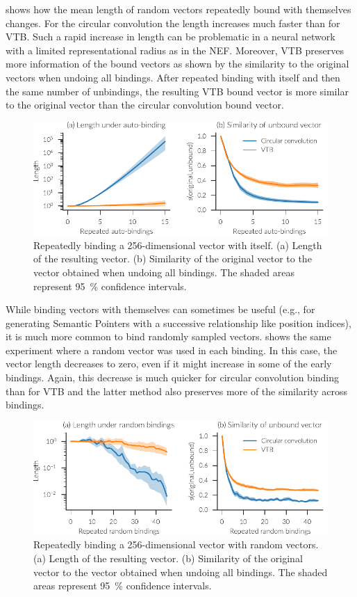 shows how the mean length of random vectors repeatedly bound with themselves changes.
For the circular convolution the length increases much faster than for VTB\@.
Such a rapid increase in length can be problematic in a neural network with a limited representational radius as in the NEF\@.
Moreover, VTB preserves more information of the bound vectors as shown by the similarity to the original vectors when undoing all bindings.
After repeated binding with itself and then the same number of unbindings, the resulting VTB bound vector is more similar to the original vector than the circular convolution bound vector.
\begin{figure}
    \centering
    \includegraphics{figures/bindings-autoconv}
    \caption[Repeatedly binding a 256-dimensional vector with itself.]{Repeatedly binding a 256-dimensional vector with itself. (a) Length of the resulting vector. (b) Similarity of the original vector to the vector obtained when undoing all bindings. The shaded areas represent \SI{95}{\percent} confidence intervals.}\label{fig:bindings-autoconv}
\end{figure}

While binding vectors with themselves can sometimes be useful (e.g., for generating Semantic Pointers with a successive relationship like position indices), it is much more common to bind randomly sampled vectors.
 shows the same experiment where a random vector was used in each binding.
In this case, the vector length decreases to zero, even if it might increase in some of the early bindings.
Again, this decrease is much quicker for circular convolution binding than for VTB and the latter method also preserves more of the similarity across bindings.
\begin{figure}
    \centering
    \includegraphics{figures/bindings-random}
    \caption[Repeatedly binding a 256-dimensional vector with random vectors.]{Repeatedly binding a 256-dimensional vector with random vectors. (a) Length of the resulting vector. (b) Similarity of the original vector to the vector obtained when undoing all bindings. The shaded areas represent \SI{95}{\percent} confidence intervals.}\label{fig:bindings-random}
\end{figure}

